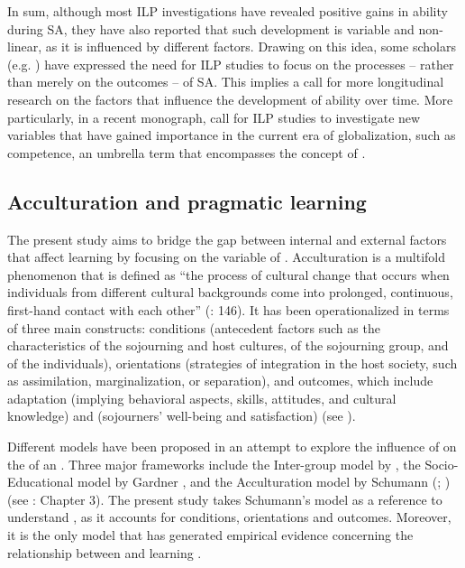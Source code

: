 \documentclass[output=paper]{langsci/langscibook}
\begin{document}
In sum, although most ILP investigations have revealed positive gains in  ability during SA, they have also reported that such  development is variable and non-linear, as it is influenced by different factors. Drawing on this idea, some scholars (e.g. \citealt{Taguchi2015contextually}) have expressed the need for ILP studies to focus on the processes – rather than merely on the outcomes – of SA. This implies a call for more longitudinal research on the factors that influence the development of  ability over time. More particularly, in a recent monograph, \citet{TaguchiRoever2017} call for ILP studies to investigate new variables that have gained importance in the current era of globalization, such as  competence, an umbrella term that encompasses the concept of .

\subsection{Acculturation and pragmatic learning}\label{sec:sanchez:2.2}

The present study aims to bridge the gap between internal and external factors that affect   learning by focusing on the variable of . {Acculturation} is a multifold phenomenon that is defined as “the process of cultural change that occurs when individuals from different cultural backgrounds come into prolonged, continuous, first-hand contact with each other” (\citealt{RedfieldEtAl1936}: 146). It has been operationalized in terms of three main constructs:  conditions (antecedent factors such as the characteristics of the sojourning and host cultures, of the sojourning group, and of the individuals),  orientations (strategies of integration in the host society, such as assimilation, marginalization, or separation), and  outcomes, which include  adaptation (implying behavioral aspects, skills, attitudes, and cultural knowledge) and  (sojourners’ well-being and satisfaction) (see \citealt{Arends-TóthVanDeVijver2006}). 

Different models have been proposed in an attempt to explore the influence of  on the  of an . Three major frameworks include the Inter-group model by \citet{BeebeGiles1984}, the Socio-Educational model by Gardner \citep{GardnerEtAl1983}, and the Acculturation model by Schumann (\citeyear{Schumann1978}; \citeyear{Schumann1986}) (see \citealt{Ellis1994}: Chapter 3). The present study takes Schumann’s model as a reference to understand , as it accounts for  conditions, orientations and outcomes. Moreover, it is the only model that has generated empirical evidence concerning the relationship between  and  learning \citep{Schmidt1983,DörnyeiEtAl2004,SchmittEtAl2004}.
\end{document}

